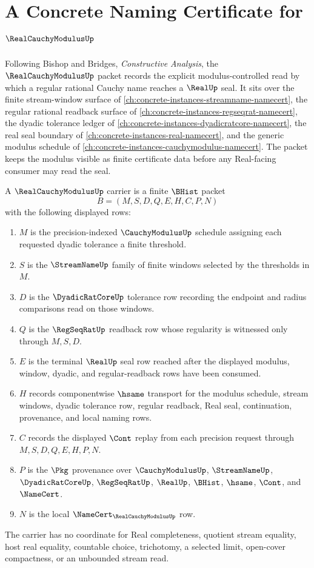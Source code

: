 \chapter{A Concrete Naming Certificate for $\RealCauchyModulusUp$}
\label{ch:concrete-instances-realcauchymodulus-namecert}

Following Bishop and Bridges, \emph{Constructive Analysis}, the $\RealCauchyModulusUp$ packet records the explicit modulus-controlled read by which a regular rational Cauchy name reaches a $\RealUp$ seal. It sits over the finite stream-window surface of \autoref{ch:concrete-instances-streamname-namecert}, the regular rational readback surface of \autoref{ch:concrete-instances-regseqrat-namecert}, the dyadic tolerance ledger of \autoref{ch:concrete-instances-dyadicratcore-namecert}, the real seal boundary of \autoref{ch:concrete-instances-real-namecert}, and the generic modulus schedule of \autoref{ch:concrete-instances-cauchymodulus-namecert}. The packet keeps the modulus visible as finite certificate data before any Real-facing consumer may read the seal.

\begin{definition}
\label{def:real-cauchy-modulus-carrier}
A $\RealCauchyModulusUp$ carrier is a finite $\BHist$ packet
$$
B=(M,S,D,Q,E,H,C,P,N)
$$
with the following displayed rows:
\begin{enumerate}
\item $M$ is the precision-indexed $\CauchyModulusUp$ schedule assigning each requested dyadic tolerance a finite threshold.
\item $S$ is the $\StreamNameUp$ family of finite windows selected by the thresholds in $M$.
\item $D$ is the $\DyadicRatCoreUp$ tolerance row recording the endpoint and radius comparisons read on those windows.
\item $Q$ is the $\RegSeqRatUp$ readback row whose regularity is witnessed only through $M,S,D$.
\item $E$ is the terminal $\RealUp$ seal row reached after the displayed modulus, window, dyadic, and regular-readback rows have been consumed.
\item $H$ records componentwise $\hsame$ transport for the modulus schedule, stream windows, dyadic tolerance row, regular readback, Real seal, continuation, provenance, and local naming rows.
\item $C$ records the displayed $\Cont$ replay from each precision request through $M,S,D,Q,E,H,P,N$.
\item $P$ is the $\Pkg$ provenance over $\CauchyModulusUp$, $\StreamNameUp$, $\DyadicRatCoreUp$, $\RegSeqRatUp$, $\RealUp$, $\BHist$, $\hsame$, $\Cont$, and $\NameCert$.
\item $N$ is the local $\NameCert_{\RealCauchyModulusUp}$ row.
\end{enumerate}
The carrier has no coordinate for Real completeness, quotient stream equality, host real equality, countable choice, trichotomy, a selected limit, open-cover compactness, or an unbounded stream read.
\end{definition}

